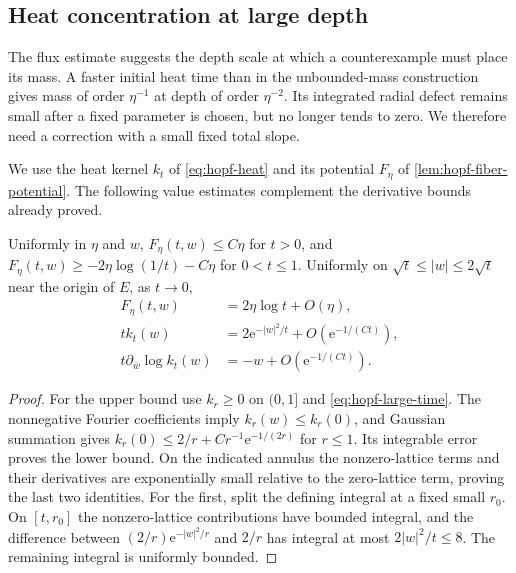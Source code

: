 \subsection{Heat concentration at large depth}

The flux estimate suggests the depth scale at which a counterexample must place its mass. A faster initial heat time than in the unbounded-mass construction gives mass of order $\eta^{-1}$ at depth of order $\eta^{-2}$. Its integrated radial defect remains small after a fixed parameter is chosen, but no longer tends to zero. We therefore need a correction with a small fixed total slope.

We use the heat kernel $k_t$ of \eqref{eq:hopf-heat} and its potential $F_\eta$ of \cref{lem:hopf-fiber-potential}. The following value estimates complement the derivative bounds already proved.

\begin{lemma}\label{lem:rotational-heat-values}
Uniformly in $\eta$ and $w$,
$F_\eta(t,w)\leq C\eta$ for $t>0$, and
$F_\eta(t,w)\geq-2\eta\log(1/t)-C\eta$ for $0<t\leq1$.
Uniformly on $\sqrt t\leq|w|\leq2\sqrt t$ near the origin of $E$, as $t\to0$,
\begin{align*}
 F_\eta(t,w)&=2\eta\log t+O(\eta),\\
 t k_t(w)&=2\mathrm e^{-|w|^2/t}+O(\mathrm e^{-1/(Ct)}),\\
 t\partial_{\bar w}\log k_t(w)&=-w+O(\mathrm e^{-1/(Ct)}).
\end{align*}
\end{lemma}
\begin{proof}
For the upper bound use $k_r\geq0$ on $(0,1]$ and \eqref{eq:hopf-large-time}.
The nonnegative Fourier coefficients imply $k_r(w)\leq k_r(0)$, and Gaussian
summation gives
$k_r(0)\leq2/r+C r^{-1}\mathrm e^{-1/(2r)}$ for $r\leq1$.
Its integrable error proves the lower bound.
On the indicated annulus the nonzero-lattice terms and their derivatives
are exponentially small relative to the zero-lattice term, proving the last
two identities. For the first, split the defining integral at a fixed small
$r_0$. On $[t,r_0]$ the nonzero-lattice contributions have bounded integral,
and the difference between $(2/r)\mathrm e^{-|w|^2/r}$ and $2/r$ has integral
at most $2|w|^2/t\leq8$. The remaining integral is uniformly bounded.
\end{proof}

